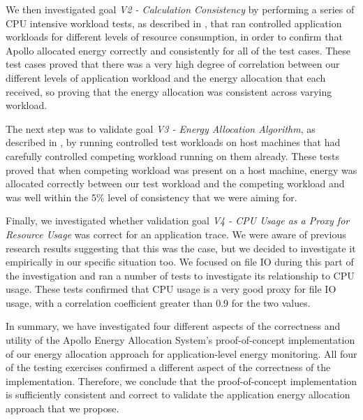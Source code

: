 We then investigated goal \textit{V2 - Calculation Consistency} by performing a series of CPU intensive workload tests, as described in , that ran controlled application workloads for different levels of resource consumption, in order to confirm that Apollo allocated energy correctly and consistently for all of the test cases.  These test cases proved that there was a very high degree of correlation between our different levels of application workload and the energy allocation that each received, so proving that the energy allocation was consistent across varying workload.

The next step was to validate goal \textit{V3 - Energy Allocation Algorithm}, as described in , by running controlled test workloads on host machines that had carefully controlled competing workload running on them already. These tests proved that when competing workload was present on a host machine, energy was allocated correctly between our test workload and the competing workload and was well within the 5\% level of consistency that we were aiming for.

Finally, we investigated whether validation goal \textit{V4 - CPU Usage as a Proxy for Resource Usage} was correct for an application trace.  We were aware of previous research results suggesting that this was the case, but we decided to investigate it empirically in our specific situation too.  We focused on file IO during this part of the investigation and ran a number of tests to investigate its relationship to CPU usage.  These tests confirmed that CPU usage is a very good proxy for file IO usage, with a correlation coefficient greater than 0.9 for the two values.

In summary, we have investigated four different aspects of the correctness and utility of the Apollo Energy Allocation System's proof-of-concept implementation of our energy allocation approach for application-level energy monitoring.  All four of the testing exercises confirmed a different aspect of the correctness of the implementation.  Therefore, we conclude that the proof-of-concept implementation is sufficiently consistent and correct to validate the application energy allocation approach that we propose.

